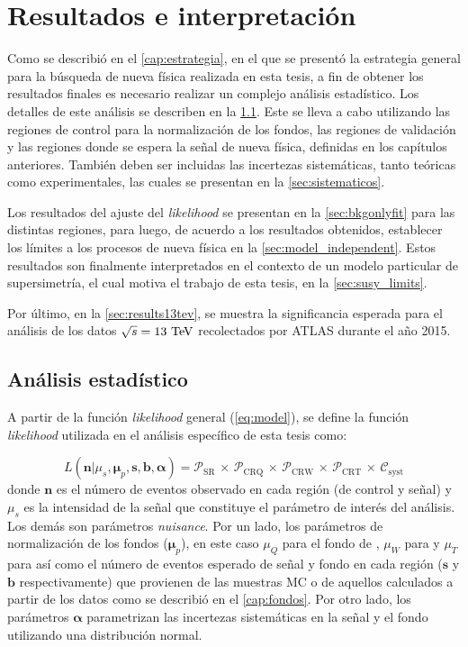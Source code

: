 \chapter{Resultados e interpretación}
\label{cap:resultados}

Como se describió en el \cref{cap:estrategia}, en el que se presentó la
estrategia general para la búsqueda de nueva física realizada en esta tesis, a
fin de obtener los resultados finales es necesario realizar un complejo análisis
estadístico. Los detalles de este análisis se describen en la
\cref{sec:analisis}. Este se lleva a cabo utilizando las regiones de control
para la normalización de los fondos, las regiones de validación y las regiones
donde se espera la señal de nueva física, definidas en los capítulos anteriores.
También deben ser incluidas las incertezas sistemáticas, tanto teóricas como
experimentales, las cuales se presentan en la \cref{sec:sistematicos}.

Los resultados del ajuste del \emph{likelihood} se presentan en la
\cref{sec:bkgonlyfit} para las distintas regiones, para luego, de acuerdo a los
resultados obtenidos, establecer los límites a los procesos de nueva física en
la \cref{sec:model_independent}. Estos resultados son finalmente interpretados
en el contexto de un modelo particular de supersimetría, el cual motiva el
trabajo de esta tesis, en la \cref{sec:susy_limits}.

Por último, en la \cref{sec:results13tev}, se muestra la significancia esperada
para el análisis de los datos $\sqrt{s} = 13 \tev$ recolectados por ATLAS durante
el a\~no 2015.


\section{Análisis estadístico}
\label{sec:analisis}

A partir de la función \emph{likelihood} general (\cref{eq:model}), se define la
función \emph{likelihood} utilizada en el análisis específico de esta tesis como:

\begin{equation}
  L(\bm{n}|\mu_s, \bm{\mu}_p, \bm{s}, \bm{b}, \bm{\alpha}) = \mathcal{P}_\text{SR} \, \times \, \mathcal{P}_\text{CRQ} \, \times \, \mathcal{P}_\text{CRW} \, \times \, \mathcal{P}_\text{CRT} \, \times \, \mathcal{C}_\text{syst}
  \label{eq:likelihood}
\end{equation}
%
donde $\bm{n}$ es el número de eventos observado en cada región (de control y
señal) y $\mu_s$ es la intensidad de la señal que constituye el parámetro de
interés del análisis. Los demás son parámetros \emph{nuisance}. Por
un lado, los parámetros de normalización de los fondos ($\bm{\mu}_p$), en este
caso $\mu_Q$ para el fondo de {\gjet}, $\mu_W$ para {\wgam} y $\mu_T$ para
{\ttgam} así como  el número de eventos esperado de señal y fondo en cada región
($\bm{s}$ y $\bm{b}$ respectivamente) que provienen de las muestras MC o
de aquellos calculados a partir de los datos como se describió en el
\cref{cap:fondos}. Por otro lado, los parámetros $\bm{\alpha}$ parametrizan las incertezas
sistemáticas en la señal y el fondo utilizando una distribución normal.

